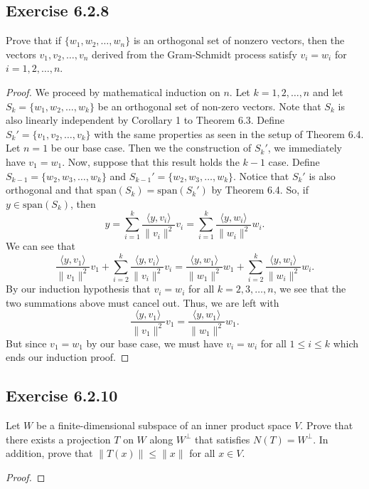 \subsection*{Exercise 6.2.8} Prove that if \( \{ {w}_{1}, {w}_{2}, \dots, {w}_{n} \}  \) is an orthogonal set of nonzero vectors, then the vectors \( {v}_{1}, {v}_{2}, \dots, {v}_{n} \) derived from the Gram-Schmidt process satisfy \( {v}_{i} = {w}_{i} \) for \( i = 1,2,\dots, n \).
\begin{proof}
    We proceed by mathematical induction on \( n  \). Let \(  k = 1,2,\dots, n \) and let \( S_k = \{ {w}_{1}, {w}_{2}, \dots, {w}_{k} \}  \) be an orthogonal set of non-zero vectors. Note that \( S_k  \) is also linearly independent by Corollary 1 to Theorem 6.3. Define \( {S}_{k}' = \{ {v}_{1}, {v}_{2}, \dots, {v}_{k} \}  \) with the same properties as seen in the setup of Theorem 6.4. Let \(  n = 1  \) be our base case. Then we the construction of \( {S}_{k}' \), we immediately have \( {v}_{1} = {w}_{1} \). Now, suppose that this result holds the \( k - 1  \) case. Define \( {S}_{k-1} = \{ {w}_{2}, {w}_{3}, \dots, {w}_{k} \}  \) and \( {S}_{k-1}' = \{ {w}_{2}, {w}_{3}, \dots, {w}_{k} \}  \). Notice that \( {S}_{k}' \) is also orthogonal and that \( \text{span}(S_k) = \text{span}({S}_{k}') \) by Theorem 6.4. So, if \( y \in \text{span}({S}_{k}) \), then
    \[  y = \sum_{ i=1  }^{ k  } \frac{ \langle y , {v}_{i} \rangle  }{ \|{v}_{i}\|^{2} } {v}_{i} = \sum_{ i=1  }^{ k  } \frac{ \langle y , {w}_{i} \rangle }{ \|{w}_{i}\|^{2} } {w}_{i}. \]
    We can see that 
    \[  \frac{ \langle y , {v}_{1} \rangle }{  \|{v}_{1}\|^{2} } {v}_{1}  + \sum_{ i=2  }^{ k } \frac{ \langle y , {v}_{i} \rangle }{ \|{v}_{i}\|^{2} } {v}_{i} =  \frac{ \langle y , {w}_{1}  \rangle }{ \|{w}_{1}\|^{2} } {w}_{1} + \sum_{ i=2  }^{ k  } \frac{ \langle y , {w}_{i} \rangle }{ \|{w}_{i}\|^{2} } {w}_{i}.   \]
    By our induction hypothesis that \( {v}_{i} = {w}_{i}  \) for all \( k = 2,3, \dots, n \), we see that the two summations above must cancel out. Thus, we are left with
    \[  \frac{ \langle y , {v}_{1} \rangle }{ \|{v}_{1}\|^{2} }  {v}_{1} = \frac{ \langle y , {w}_{1} \rangle }{ \|{w}_{1}\|^{2} } {w}_{1}. \]
    But since \( {v}_{1} = {w}_{1} \) by our base case, we must have \( {v}_{i} = {w}_{i}  \) for all \( 1 \leq i \leq k  \) which ends our induction proof. 
\end{proof}

\subsection*{Exercise 6.2.10} Let \( W  \) be a finite-dimensional subspace of an inner product space \( V  \). Prove that there exists a projection \( T  \) on \( W  \) along \( W^{\perp} \) that satisfies \( N(T) = W^{\perp} \). In addition, prove that \( \|T(x)\| \leq \|x\| \) for all \( x \in V  \).
\begin{proof}

\end{proof}

